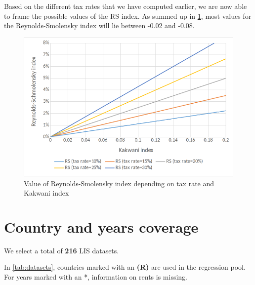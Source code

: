 Based on the different tax rates that we have computed earlier, we are now able to frame the possible values of the RS index. As summed up in \cref{fig:RS_scenarii}, most values for the Reynolds-Smolensky index will lie between -0.02 and -0.08.
\begin{figure}
	\centering
	\includegraphics[scale=0.8]{"images/18-12 RS_scenarii"}
	\caption{Value of Reynolds-Smolensky index depending on tax rate and Kakwani index}
	\label{fig:RS_scenarii}
\end{figure}

\section{Country and years coverage}
\label{A-datasets}
We select a total of \textbf{216} LIS datasets. 

In \cref{tab:datasets}, countries marked with an \textbf{(R)} are used in the regression pool. For years marked with an *, information on rents is missing.

